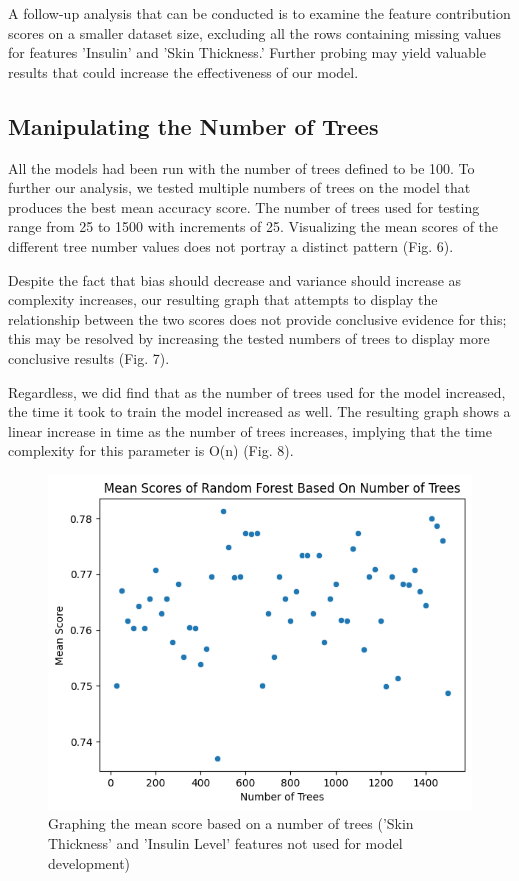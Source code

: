 \documentclass[journal]{IEEEtran}
\begin{document}
A follow-up analysis that can be conducted is to examine the feature contribution scores on a smaller dataset size, excluding all the rows containing missing values for features 'Insulin' and 'Skin Thickness.' Further probing may yield valuable results that could increase the effectiveness of our model.

\subsection{Manipulating the Number of Trees}

All the models had been run with the number of trees defined to be 100. To further our analysis, we tested multiple numbers of trees on the model that produces the best mean accuracy score. The number of trees used for testing range from 25 to 1500 with increments of 25. Visualizing the mean scores of the different tree number values does not portray a distinct pattern (Fig. 6).

Despite the fact that bias should decrease and variance should increase as complexity increases, our resulting graph that attempts to display the relationship between the two scores does not provide conclusive evidence for this; this may be resolved by increasing the tested numbers of trees to display more conclusive results (Fig. 7).

Regardless, we did find that as the number of trees used for the model increased, the time it took to train the model increased as well. The resulting graph shows a linear increase in time as the number of trees increases, implying that the time complexity for this parameter is O(n) (Fig. 8).

\begin{figure}
    \centering
    \includegraphics[width=1\linewidth]{mean_scores_num_trees.png}
    \caption{Graphing the mean score based on a number of trees ('Skin Thickness' and 'Insulin Level' features not used for model development)}
    \label{fig:enter-label}
\end{figure}
\end{document}
